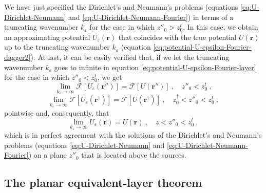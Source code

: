 We have just specified the Dirichlet's and Neumann's problems 
(equations \ref{eq:U-Dirichlet-Neumann} and \ref{eq:U-Dirichlet-Neumann-Fourier}) in terms of a truncating wavenumber 
$k_{\varepsilon}$ for the case in which $z''_{0} > z^{t}_{0}$. 
In this case, we obtain an approximating potential $U_{\varepsilon}(\mathbf{r})$ that coincides with the true 
potential $U(\mathbf{r})$ up to the truncating wavenumber $k_{\varepsilon}$ 
(equation \ref{eq:potential-U-epsilon-Fourier-dagger2}). 
At last, it can be easily verified that, if we let the truncating wavenumber $k_{\varepsilon}$ 
goes to infinite in equation \ref{eq:potential-U-epsilon-Fourier-layer} for the case in which $z''_{0} < z^{t}_{0}$, we get 
\begin{equation}
	\lim_{k_{\varepsilon}\to\infty} \mathcal{F} \left[ U_{\varepsilon}(\mathbf{r}'') \right] = 
	\mathcal{F} \left[ U(\mathbf{r}'') \right] \: , \quad z''_{0} < z^{t}_{0} \: ,
	\label{eq:lim-kepsilon-potential-U-epsilon-Fourier-layer}
\end{equation}
\begin{equation}
	\lim_{k_{\varepsilon}\to\infty} \mathcal{F} \left[ U_{\varepsilon}(\mathbf{r}^{\dagger}) \right] = 
	\mathcal{F} \left[ U(\mathbf{r}^{\dagger}) \right] \: , \quad z^{\dagger}_{0} < z''_{0} < z^{t}_{0} \: ,
	\label{eq:lim-kepsilon-potential-U-epsilon-Fourier-dagger}
\end{equation}
pointwise and, consequently, that
\begin{equation}
	\lim_{k_{\varepsilon}\to\infty} U_{\varepsilon}(\mathbf{r}) = 
	U(\mathbf{r}) \: , \quad z < z''_{0} < z^{t}_{0} \: ,
	\label{eq:lim-kepsilon-potential-U-epsilon-space}
\end{equation}
which is in perfect agreement with the solutions of the Dirichlet's and Neumann's
problems (equations \ref{eq:U-Dirichlet-Neumann} and \ref{eq:U-Dirichlet-Neumann-Fourier}) on a plane $z''_{0}$ 
that is located above the sources.

\subsection{The planar equivalent-layer theorem}

